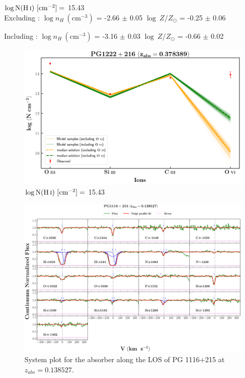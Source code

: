   $\log \text{N}(\ion{H}{i}) \ [\text{cm}^{-2}]=$ 15.43 \\
  
  Excluding  : $\log n_H \ (\text{cm}^{-3})$ = -2.66 $\pm$ 0.05 \hspace{10mm} $\log \ Z/Z_\odot$ = -0.25 $\pm$ 0.06
  
  Including  : $\log n_H \ (\text{cm}^{-3})$ = -3.16 $\pm$ 0.03 \hspace{10mm} $\log \ Z/Z_\odot$ = -0.66 $\pm$ 0.02
  
  \newpage
  
  \begin{figure}[!h]
    \centering
    \includegraphics[width=0.9\linewidth]{Ionisation-Modelling-Plots/pg1222-z=0.378389-compVI.png}
    \caption{$\log \text{N}(\ion{H}{i}) \ [\text{cm}^{-2}]=$ 15.43}
  \end{figure}
  
  
  \newpage
  \thispagestyle{empty}

  \begin{landscape}
  
  \begin{figure}
      \centering
      \vspace{-10mm}
      \hspace*{-20mm}
      \includegraphics[width=1.1\linewidth]{System-Plots/PG1116+215_z=0.138527_sys_plot.png}
      \caption{System plot for the absorber along the LOS of PG 1116+215 at $z_{abs} = 0.138527$. }
  \end{figure}
  
  \end{landscape}
  
